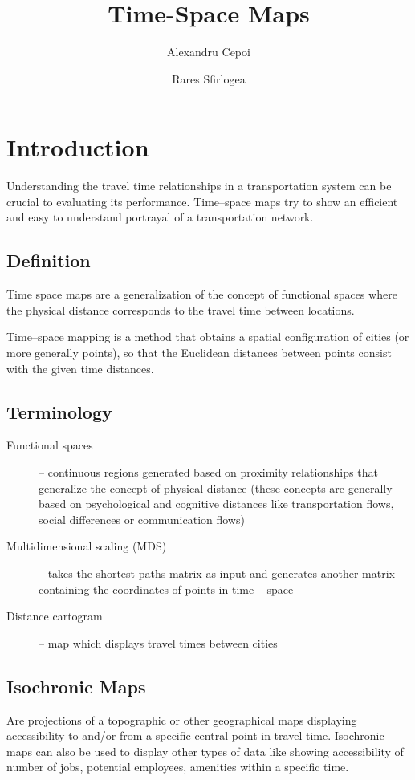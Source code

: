 \documentclass[a4paper,11pt]{article}
\title{Time-Space Maps}
\author{Alexandru Cepoi}
\author{Rares Sfirlogea}
\affil{Utrecht University}
\begin{document}
\maketitle

\section{Introduction}
Understanding the travel time relationships in a transportation system can be crucial
to evaluating its performance. Time--space maps try to show an efficient and easy to
understand portrayal of a transportation network.


\subsection{Definition}
Time space maps are a generalization of the concept of functional spaces where the
physical distance corresponds to the travel time between locations.

Time--space mapping is a method that obtains a spatial configuration of cities (or more
generally points), so that the Euclidean distances between points consist with the given time distances.

\subsection{Terminology}
\begin{description}
    \item[Functional spaces] -- continuous regions generated based on proximity relationships
that generalize the concept of physical distance (these concepts are generally based
on psychological and cognitive distances like transportation flows, social differences
or communication flows)
    \item[Multidimensional scaling (MDS)] -- takes the shortest paths matrix as input and
generates another matrix containing the coordinates of points in time – space
    \item[Distance cartogram] -- map which displays travel times between cities
\end{description}

\subsection{Isochronic Maps}
Are projections of a topographic or other geographical maps displaying accessibility to and/or from a specific central point in travel time. Isochronic maps can also be used to display other types of data like showing accessibility of
number of jobs, potential employees, amenities within a specific time.
\end{document}
